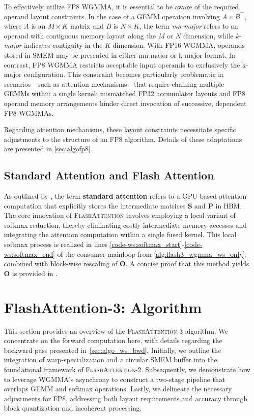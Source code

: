 To effectively utilize FP8 WGMMA, it is essential to be aware of the required operand layout constraints. In the case of a GEMM operation involving $A \times B^{\top}$, where $A$ is an $M\times K$ matrix and $B$ is $N\times K$, the term \emph{mn-major} refers to an operand with contiguous memory layout along the $M$ or $N$ dimension, while \emph{k-major} indicates contiguity in the $K$ dimension. With FP16 WGMMA, operands stored in SMEM may be presented in either mn-major or k-major format. In contrast, FP8 WGMMA restricts acceptable input operands to exclusively the k-major configuration. This constraint becomes particularly problematic in scenarios—such as attention mechanisms—that require chaining multiple GEMMs within a single kernel; mismatched FP32 accumulator layouts and FP8 operand memory arrangements hinder direct invocation of successive, dependent FP8 WGMMAs.

Regarding attention mechanisms, these layout constraints necessitate specific adjustments to the structure of an FP8 algorithm. Details of these adaptations are presented in \cref{sec:algofp8}.

\subsection{Standard Attention and Flash Attention} As outlined by \citet{dao2022flashattention}, the term \textbf{standard attention} refers to a GPU-based attention computation that explicitly stores the intermediate matrices $\mathbf{S}$ and $\mathbf{P}$ in HBM. The core innovation of \textsc{FlashAttention} involves employing a local variant of softmax reduction, thereby eliminating costly intermediate memory accesses and integrating the attention computation within a single fused kernel. This local softmax process is realized in lines \ref{code-ws:softmax_start}-\ref{code-ws:softmax_end} of the consumer mainloop from \cref{alg:flash3_wgmma_ws_only}, combined with block-wise rescaling of $\mathbf{O}$. A concise proof that this method yields $\mathbf{O}$ is provided in \cite[\S 2.3.1]{dao2023flashattention2}.

\section{FlashAttention-3: Algorithm}
\label{sec:algo}

This section provides an overview of the \textsc{FlashAttention-3} algorithm. We concentrate on the forward computation here, with details regarding the backward pass presented in~\cref{sec:algo_ws_bwd}. Initially, we outline the integration of warp-specialization and a circular SMEM buffer into the foundational framework of \textsc{FlashAttention-2}. Subsequently, we demonstrate how to leverage WGMMA's asynchrony to construct a two-stage pipeline that overlaps GEMM and softmax operations. Lastly, we delineate the necessary adjustments for FP8, addressing both layout requirements and accuracy through block quantization and incoherent processing.

